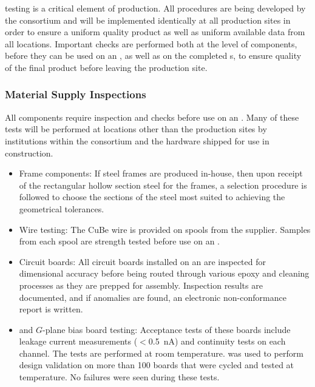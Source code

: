  testing is a critical element of  production.  All  procedures are being developed by the consortium and will be implemented identically at all production sites in order to ensure a uniform quality product as well as uniform available data from all locations.  Important  checks are performed both at the level of components, before they can be used on an , as well as on the completed s, to ensure quality of the final product before leaving the production site.

\subsubsection{Material Supply Inspections}

All components require inspection and  checks before use on an .  Many of these tests will be performed at locations other than the  production sites by institutions within the consortium and the hardware shipped for use in  construction. 

\begin{itemize}
\item Frame components: If  steel frames are produced in-house, then upon receipt of the rectangular hollow section steel for the frames, a selection procedure is followed to choose the sections of the steel most suited to achieving the geometrical tolerances. 
\item Wire testing: The CuBe wire is provided on spools from the supplier. Samples from each spool are strength tested before use on an .
\item Circuit boards: All circuit boards installed on an  are inspected for dimensional accuracy before being routed through various epoxy and cleaning processes as they are prepped for assembly. Inspection results are documented, and if anomalies are found, an electronic non-conformance report is written.  %
\item {} and $G$-plane bias board testing: Acceptance tests of these boards include leakage current measurements ($<$\SI{0.5}{nA}) and continuity tests on each channel.  The tests are performed at room temperature.  was used to perform design validation on more than \num{100} boards that were cycled and tested at \lntwo temperature. No failures were seen during these tests. 
\end{itemize}


